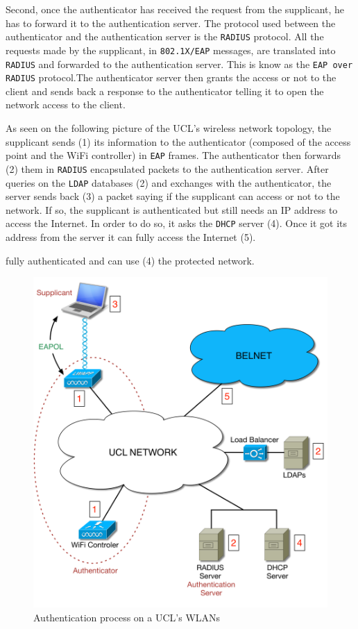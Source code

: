 Second, once the authenticator has received the request from the supplicant, he has to forward it to the authentication server. The protocol used between the authenticator and the authentication server is the \texttt{RADIUS} protocol. All the requests made by the supplicant, in \texttt{802.1X/EAP} messages, are translated into \texttt{RADIUS} and forwarded to the authentication server. This is know as the \texttt{EAP over RADIUS} protocol.The authenticator server then grants the access or not to the client and sends back a response to the authenticator telling it to open the network access to the client.

As seen on the following picture of the UCL's wireless network topology, the supplicant sends (1) its information to the authenticator (composed of the access point and the WiFi controller) in \texttt{EAP} frames. The authenticator then forwards (2) them in \texttt{RADIUS} encapsulated packets to the authentication server. After queries on the \texttt{LDAP} databases (2) and exchanges with the authenticator, the server sends back (3) a packet saying if the supplicant can access or not to the network. If so, the supplicant is authenticated but still needs an IP address to access the Internet. In order to do so, it asks the \texttt{DHCP} server (4). Once it got its address from the server it can fully access the Internet (5).

fully authenticated and can use (4) the protected network.

\begin{figure}[H]
	\includegraphics[width=.9\linewidth]{Pictures/chapter2/topology2.png}
	\caption{Authentication process on a UCL's WLANs}
\end{figure}


